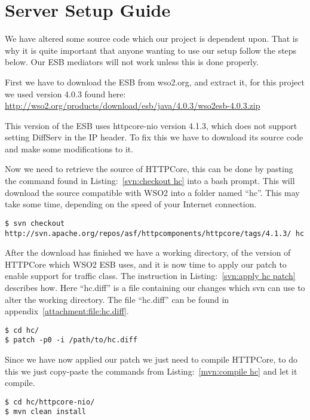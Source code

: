 \section{Server Setup Guide}\label{Server Setup Guide}
	\begin{shaded}
	We have altered some source code which our project is dependent upon. That is why it is quite important that anyone wanting to use our setup follow the steps below. Our ESB mediators will not work unless this is done properly.
	\end{shaded}

	First we have to download the ESB from wso2.org, and extract it, for this project we used version 4.0.3 found here:
\url{http://wso2.org/products/download/esb/java/4.0.3/wso2esb-4.0.3.zip}

	This version of the ESB uses httpcore-nio version 4.1.3, which does not support setting DiffServ in the IP header. To fix this we have to download its source code and make some modifications to it.

	Now we need to retrieve the source of HTTPCore, this can be done by pasting the command found in Listing:~\ref{svn:checkout hc} into a bash prompt. This will download the source compatible with WSO2 into a folder named “hc”. This may take some time, depending on the speed of your Internet connection.
\lstset{language=bash, style=shell}
\begin{lstlisting}[frame=single, caption={Checkout HttpCore source}, label=svn:checkout hc, breaklines=true]
$ svn checkout http://svn.apache.org/repos/asf/httpcomponents/httpcore/tags/4.1.3/ hc
\end{lstlisting}

	After the download has finished we have a working directory, of the version of HTTPCore which WSO2 ESB uses, and it is now time to apply our patch to enable support for traffic class. The instruction in Listing:~\ref{svn:apply hc patch} describes how. Here “hc.diff” is a file containing our changes which svn can use to alter the working directory. The file “hc.diff” can be found in appendix~\ref{attachment:file:hc.diff}.
\begin{lstlisting}[frame=single, caption={Apply HC patch}, label=svn:apply hc patch]
$ cd hc/
$ patch -p0 -i /path/to/hc.diff
\end{lstlisting}

	Since we have now applied our patch we just need to compile HTTPCore, to do this we just copy-paste the commands from Listing:~\ref{mvn:compile hc} and let it compile.
\begin{lstlisting}[frame=single, caption={Build HttpCore-NIO}, label=mvn:compile hc, breaklines=true]
$ cd hc/httpcore-nio/
$ mvn clean install
\end{lstlisting}

